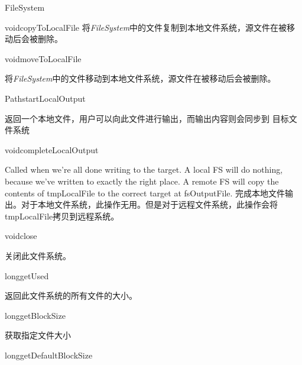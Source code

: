 \begin{XeClass}{FileSystem}
\begin{XeMethod}{\XePublic}{void}{copyToLocalFile}
 将\emph{FileSystem}中的文件复制到本地文件系统，源文件在被移动后会被删除。

    \end{XeMethod}

    \begin{XeMethod}{\XePublic}{void}{moveToLocalFile}
         
 将\emph{FileSystem}中的文件移动到本地文件系统，源文件在被移动后会被删除。

    \end{XeMethod}

    \begin{XeMethod}{\XePublic}{Path}{startLocalOutput}
         
 返回一个本地文件，用户可以向此文件进行输出，而输出内容则会同步到
 目标文件系统

    \end{XeMethod}

    \begin{XeMethod}{\XePublic}{void}{completeLocalOutput}
         
 Called when we're all done writing to the target.  A local FS will
 do nothing, because we've written to exactly the right place.  A remote
 FS will copy the contents of tmpLocalFile to the correct target at
 fsOutputFile.
 完成本地文件输出。对于本地文件系统，此操作无用。但是对于远程文件系统，此操作会将
 tmpLocalFile拷贝到远程系统。

    \end{XeMethod}

    \begin{XeMethod}{\XePublic}{void}{close}
         
 关闭此文件系统。

    \end{XeMethod}

    \begin{XeMethod}{\XePublic}{long}{getUsed}
         
 返回此文件系统的所有文件的大小。

    \end{XeMethod}

    \begin{XeMethod}{\XePublic}{long}{getBlockSize}
         
 获取指定文件大小

    \end{XeMethod}

    \begin{XeMethod}{\XePublic}{long}{getDefaultBlockSize}
         

\end{XeMethod}
\end{XeClass}
